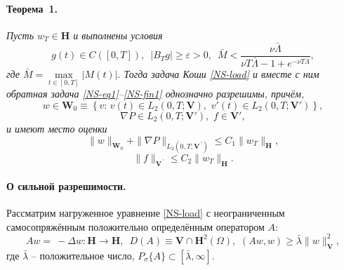 \paragraph{Теорема~1.} {\it
Пусть $w_T\in\mathbf{H}$ и выполнены условия
\begin{equation}\label{NS-cond2}
g(t)\in C([0,T]),\,\,\, \left|B_Tg\right|\geq\varepsilon>0,\,\,\, \bar{M}<\frac{\nu \bar{\Lambda}}{\nu T\bar{\Lambda}-1+e^{-\nu T\bar{\Lambda}}},
\end{equation}
где $\bar{M}=\max\limits_{t\in[0,T]}|M(t)|.$
Тогда задача Коши \eqref{NS-load} и вместе с ним обратная задача \eqref{NS-eq1}--\eqref{NS-fin1} однозначно разрешимы, причём,
$$
w\in \mathbf{W}_0\equiv \left\{v:\, v(t)\in L_2(0,T;\mathbf{V}),\,\, v'(t)\in L_2(0,T;\mathbf{V}')\right\},
$$
$$
\nabla P\in L_2(0,T; \mathbf{V}'),\,\, f\in \mathbf{V}',
$$
и имеют место оценки
\begin{equation} \label{NS-est1}
\|w\|_{\mathbf{W}_0}+\|\nabla P\|_{L_2(0,T; \mathbf{V}^{\,'})}\leq C_1\|w_T\|_{\mathbf{H}},
\end{equation}
\begin{equation} \label{NS-est2}
\|f\|_{\mathbf{V}^{\,'}}\leq C_2\|w_T\|_{\mathbf{H}}.
\end{equation}
}

\paragraph{О сильной разрешимости.}
Рассматрим нагруженное уравнение \eqref{NS-load} с неограниченным самосопряжённым положительно определённым оператором $A$:
\begin{equation} \label{NS-opA2}
Aw=\ - \Delta w: \mathbf{H}\to\mathbf{H},\,\,\, D(A)\equiv \mathbf{V}\cap \mathbf{H}^2(\Omega),\,\, (Aw,w)\geq\bar{\lambda}\|w\|_{\mathbf{V}}^2,
\end{equation}
где $\bar{\lambda}$ -- положительное число, $P_\sigma\{A\}\subset[\bar{\lambda},\infty].$


